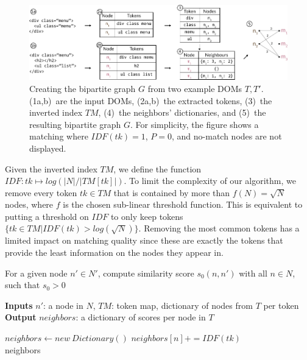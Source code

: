 \begin{figure}
    \centering
    \includegraphics[width=\linewidth]{tree-matching/explanation/inverted_index}
    \caption{Creating the bipartite graph $G$ from two example DOMs $T,T'$. (1a,b)~are the input DOMs, (2a,b)~the extracted tokens, (3)~the inverted index $TM$, (4)~the neighbors' dictionaries, and (5)~the resulting bipartite graph $G$. For simplicity, the figure shows a matching where $IDF(tk)=1$, $P=0$, and no-match nodes are not displayed.}\label{sftm:fig:inverted_index}
\end{figure}

Given the inverted index $TM$, we define the function $IDF: tk \mapsto log(|N|/|TM[tk]|)$.
To limit the complexity of our algorithm, we remove every token $tk \in TM$ that is contained by more than $f(N)=\sqrt{N}$ nodes, where $f$ is the chosen sub-linear threshold function.
This is equivalent to putting a threshold on $IDF$ to only keep tokens $\{tk \in TM |IDF(tk) > log(\sqrt{N})\}$.
Removing the most common tokens has a limited impact on matching quality since these are exactly the tokens that provide the least information on the nodes they appear in.

\begin{algorithm}
\caption{For a given node $n'\in N'$, compute similarity score $s_0(n,n')$ with all $n\in N$, such that $s_0 > 0$}
\hspace*{\algorithmicindent} \textbf{Inputs}
$n'$: a node in $N$, 
$TM$: token map, dictionary of nodes from $T$ per token \\
\hspace*{\algorithmicindent} \textbf{Output} 
$neighbors$: a dictionary of scores per node in $T$
\begin{algorithmic}
\State $neighbors \gets new\ Dictionary()$
        \State $neighbors[n] += IDF(tk)$
    \EndFor
\EndFor \\
\Return neighbors
\end{algorithmic}
\label{scoreAlgo}
\end{algorithm}

